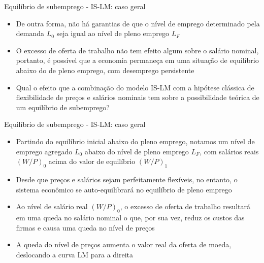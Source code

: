 \documentclass[10pt]{beamer}
\begin{document}
\begin{frame}{Equilíbrio de subemprego - IS-LM: caso geral}
    \begin{itemize}
        \item De outra forma, não há garantias de que o nível de emprego determinado pela demanda $L_0$ seja igual ao nível de pleno emprego $L_F$
        \bigskip
        \item O excesso de oferta de trabalho não tem efeito algum sobre o salário nominal, portanto, é possível que a economia permaneça em uma situação de equilíbrio abaixo do de pleno emprego, com desemprego persistente
        \bigskip
        \item Qual o efeito que a combinação do modelo IS-LM com a hipótese clássica de flexibilidade de preços e salários nominais tem sobre a possibilidade teórica de um equilíbrio de subemprego?
    \end{itemize}
\end{frame}

\begin{frame}{Equilíbrio de subemprego - IS-LM: caso geral}
    \begin{itemize}
        \item Partindo do equilíbrio inicial abaixo do pleno emprego, notamos um nível de emprego agregado $L_0$ abaixo do nível de pleno emprego $L_F$, com salários reais $(W/P)_0$ acima do valor de equilíbrio $(W/P)_1$
        \bigskip
        \item Desde que preços e salários sejam perfeitamente flexíveis, no entanto, o sistema econômico se auto-equilibrará no equilíbrio de pleno emprego
        \bigskip
        \item Ao nível de salário real $(W/P)_0$, o excesso de oferta de trabalho resultará em uma queda no salário nominal o que, por sua vez, reduz os custos das firmas e causa uma queda no nível de preços
        \bigskip
        \item A queda do nível de preços aumenta o valor real da oferta de moeda, deslocando a curva LM para a direita
    \end{itemize}
\end{frame}
\end{document}
